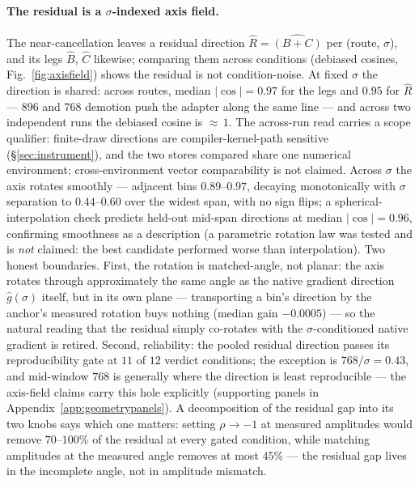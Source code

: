 \paragraph{The residual is a $\sigma$-indexed axis field.}
The near-cancellation leaves a residual direction
$\widehat{R} = \widehat{(B{+}C)}$ per (route, $\sigma$), and its legs
$\widehat{B}$, $\widehat{C}$ likewise; comparing them across
conditions (debiased cosines, Fig.~\ref{fig:axisfield}) shows the
residual is not condition-noise. At fixed $\sigma$ the direction is
shared: across routes, median $|\cos| = 0.97$ for the legs and
$0.95$ for $\widehat{R}$ --- $896$ and $768$ demotion push the
adapter along the same line --- and across two independent runs the
debiased cosine is ${\approx}\,1$. The across-run read carries a
scope qualifier: finite-draw directions are compiler-kernel-path
sensitive (\S\ref{sec:instrument}), and the two stores compared
share one numerical environment; cross-environment vector
comparability is not claimed. Across $\sigma$ the axis rotates
smoothly --- adjacent bins $0.89$--$0.97$, decaying monotonically
with $\sigma$ separation to $0.44$--$0.60$ over the widest span,
with no sign flips; a spherical-interpolation check predicts held-out
mid-span directions at median $|\cos| = 0.96$, confirming smoothness
as a description (a parametric rotation law was tested and is
\emph{not} claimed: the best candidate performed worse than
interpolation). Two honest boundaries. First, the rotation is
matched-angle, not planar: the axis rotates through approximately the
same angle as the native gradient direction $\hat g(\sigma)$ itself,
but in its own plane --- transporting a bin's direction by the
anchor's measured rotation buys nothing (median gain $-0.0005$) ---
so the natural reading that the residual simply co-rotates with the
$\sigma$-conditioned native gradient is retired. Second,
reliability: the pooled residual direction passes its
reproducibility gate at $11$ of $12$ verdict conditions; the
exception is $768/\sigma = 0.43$, and mid-window $768$ is generally
where the direction is least reproducible --- the axis-field claims
carry this hole explicitly (supporting panels in
Appendix~\ref{app:geometrypanels}). A decomposition of the residual gap into
its two knobs says which one matters: setting $\rho \to -1$ at
measured amplitudes would remove $70$--$100\%$ of the residual at
every gated condition, while matching amplitudes at the measured
angle removes at most $45\%$ --- the residual gap lives in the
incomplete angle, not in amplitude mismatch.

